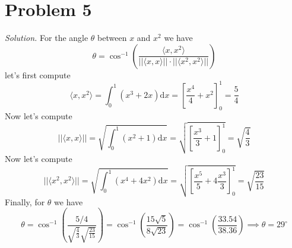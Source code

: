 \documentclass{article}
\begin{document}
\section*{Problem 5}
\emph{Solution. }For the angle $\theta$ between $x$ and $x^2$ we have
\begin{equation*}
    \theta = \cos^{-1}\left(\frac{\langle x, x^2\rangle}{||\langle x, x\rangle||\cdot||\langle x^2, x^2 \rangle||}\right)
\end{equation*}
\newpage
{} let's first compute
\begin{equation*}
    \langle x, x^2 \rangle = \int_{0}^{1}(x^3 + 2x)\text{d}x = \left[\frac{x^4}{4} + x^2\right]_{0}^{1} = \frac{5}{4}
\end{equation*}
Now let's compute
\begin{equation*}
    ||\langle x, x\rangle|| = \sqrt{\int_{0}^{1} (x^2 + 1)\text{d}x} = \sqrt{\left[\frac{x^3}{3} + 1\right]_{0}^{1}} = \sqrt{\frac{4}{3}}
\end{equation*}
Now let's compute
\begin{equation*}
    ||\langle x^2, x^2\rangle|| = \sqrt{\int_{0}^{1} (x^4 + 4x^2)\text{d}x} = \sqrt{\left[\frac{x^5}{5} + 4\frac{x^3}{3}\right]_{0}^{1}} = \sqrt{\frac{23}{15}}
\end{equation*}
Finally, for $\theta$ we have
\begin{equation*}
    \theta = \cos^{-1}\left(\frac{5/4}{\sqrt{\frac{4}{3}}\sqrt{\frac{23}{15}}}\right) = \cos^{-1}\left(\frac{15\sqrt{5}}{8\sqrt{23}}\right) = \cos^{-1}\left(\frac{33.54}{38.36}\right) \implies \theta = 29^{\circ}
\end{equation*}
\end{document}
